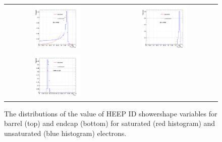 \begin{figure}[bh]
  \begin{center}
    \begin{tabular}{cc}
      \includegraphics[width=0.45\textwidth]{chapters/Zprime/Saturation/images/FlatPt/compare_s_nos/compare_E15OverE55_Barrel.png} &
      \includegraphics[width=0.45\textwidth]{chapters/Zprime/Saturation/images/FlatPt/compare_s_nos/compare_E25OverE55_Barrel.png} \\
      \includegraphics[width=0.45\textwidth]{chapters/Zprime/Saturation/images/FlatPt/compare_s_nos/compare_Sieie_Endcap.png} &
    \end{tabular}
    \caption{ The distributions of the value of HEEP ID showershape variables for barrel (top) and endcap (bottom) for saturated (red histogram) and unsaturated (blue histogram) electrons.}
    \label{fig:ShowerShape}
  \end{center}
\end{figure}


